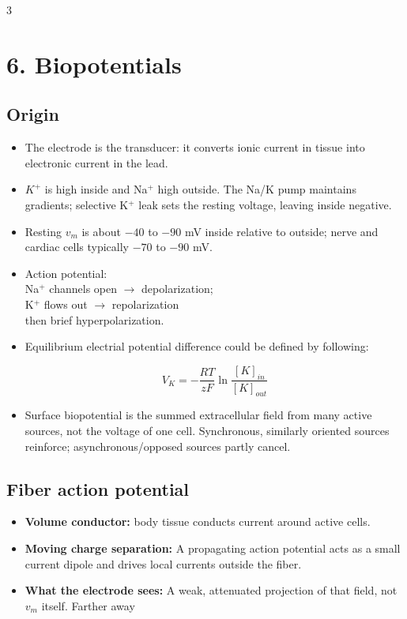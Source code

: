 \documentclass[10pt,a4paper]{ctexart}
\newcommand{\key}[1]{\textbf{#1}}
\newcommand{\formula}[1]{%
  \par\vspace{1pt}%
  \begingroup
  \setlength{\abovedisplayskip}{0pt}%
  \setlength{\belowdisplayskip}{0pt}%
  \[
    #1
  \]
  \endgroup
  \vspace{1pt}%
}
\begin{document}
\begin{multicols*}{3}
\section{6. Biopotentials}
\subsection{Origin}
\begin{itemize}
  \item The electrode is the transducer: it converts ionic current in tissue
  into electronic current in the lead.
  \item $K^+$ is high inside and Na$^+$ high outside. The Na/K pump maintains
  gradients; selective K$^+$ leak sets the resting voltage, leaving inside negative.
  \item Resting $v_m$ is about $-40$ to $-90$ mV inside relative to outside;
  nerve and cardiac cells typically $-70$ to $-90$ mV.
  \item Action potential: \\
  Na$^+$ channels open $\rightarrow$ depolarization;\\
  K$^+$ flows out $\rightarrow$ repolarization\\
  then brief hyperpolarization.
  \item Equilibrium electrial potential difference could be defined by following:
  \formula{\displaystyle V_{K} = -\frac{RT}{zF} \ln\frac{[K]_{in}}{[K]_{out}}}
  \item Surface biopotential is the summed extracellular field from many active
  sources, not the voltage of one cell. Synchronous, similarly oriented sources
  reinforce; asynchronous/opposed sources partly cancel.
\end{itemize}

\subsection{Fiber action potential}
\begin{itemize}
    \item \key{Volume conductor:} body tissue conducts current around active cells.
    \item \key{Moving charge separation:} A propagating action potential acts as a small current dipole and drives 
    local currents outside the fiber.
    \item \key{What the electrode sees:} A weak, attenuated projection of that field, not $v_m$ itself. Farther away
\end{itemize}


\end{multicols*}
\end{document}
